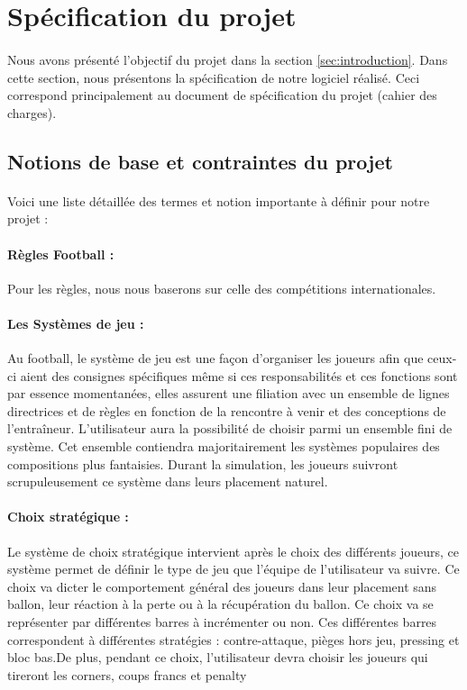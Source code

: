 \newpage
\section{Spécification du projet}
\label{sec:specification}

\paragraph{} Nous avons présenté l'objectif du projet dans la section \ref{sec:introduction}. Dans cette section, nous présentons la spécification de notre logiciel réalisé. Ceci correspond principalement au document de spécification du projet (cahier des charges).

\subsection{Notions de base et contraintes du projet}
\label{sec:spec1}

\paragraph{}
    Voici une liste détaillée des termes et notion importante à définir pour notre projet :


\paragraph{Règles Football :} Pour les règles, nous nous baserons sur celle des compétitions internationales.

\paragraph{Les Systèmes de jeu :} Au football, le système de jeu est une façon d’organiser les joueurs afin que ceux-ci aient des consignes spécifiques même si ces responsabilités et ces fonctions sont par essence momentanées, elles assurent une filiation avec un ensemble de lignes directrices et de règles en fonction de la rencontre à venir et des conceptions de l’entraîneur. L’utilisateur aura la possibilité de choisir parmi un ensemble fini de système. Cet ensemble contiendra majoritairement les systèmes populaires des compositions plus fantaisies. Durant la simulation, les joueurs suivront scrupuleusement ce système dans leurs placement naturel.

\paragraph{Choix stratégique :} Le système de choix stratégique intervient après le choix des différents joueurs, ce système permet de définir le type de jeu que l'équipe de l’utilisateur va suivre. Ce choix va dicter le comportement général des joueurs dans leur placement sans ballon, leur réaction à la perte ou à la récupération du ballon. Ce choix va se représenter par différentes barres à incrémenter ou non. Ces différentes barres correspondent à différentes stratégies : contre-attaque, pièges hors jeu, pressing et bloc bas.De plus, pendant ce choix, l’utilisateur devra choisir les joueurs qui tireront les corners, coups francs et penalty

